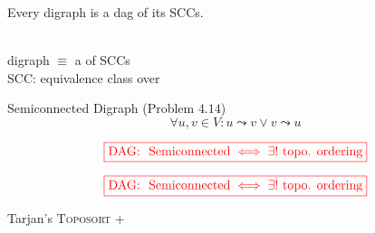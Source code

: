 
\begin{frame}{}
  \begin{theorem}
    Every digraph is a dag of its SCCs.
  \end{theorem}


  \pause
  \begin{center}
     \\[15pt] 

    digraph $\equiv$ a  of SCCs \\[6pt]

    SCC: equivalence class over 
  \end{center}
\end{frame}

\begin{frame}{}
  \begin{exampleblock}{Semiconnected Digraph (Problem $4.14$)}
    \[
      \forall u,v \in V: u \leadsto v \lor v \leadsto u
    \]
  \end{exampleblock}

  \pause
  \vspace{0.50cm}
  \centerline{}

  \pause
  \vspace{0.50cm}

  \pause
  \[
    \textcolor{red}{\boxed{\text{DAG: } \text{ Semiconnected} \iff \exists! \text{ topo. ordering}}}
  \]
\end{frame}

\begin{frame}{}
  \[
    \textcolor{red}{\boxed{\text{DAG: } \text{ Semiconnected} \iff \exists! \text{ topo. ordering}}}
  \]

  \pause
  \vspace{0.80cm}
  \centerline{Tarjan's \textsc{Toposort} + }

  \pause
  \vspace{0.30cm}
\end{frame}

